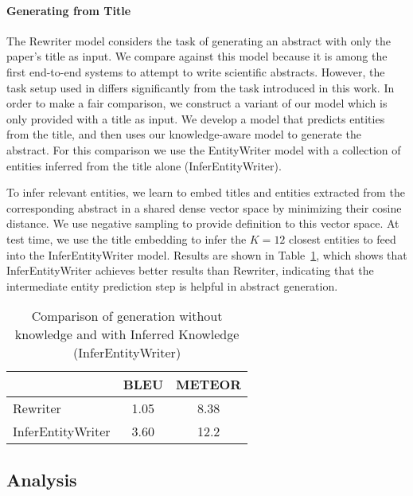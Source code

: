 \documentclass[11pt,a4paper]{article}
\begin{document}
\paragraph{Generating from Title} 
The Rewriter model \cite{wang2018paper} considers the task of generating an abstract with only the paper's title as input. 
We compare against this model because it is among the first end-to-end systems to attempt to write scientific abstracts. 
However, the task setup used in \citet{wang2018paper} differs significantly from the task introduced in this work.
In order to make a fair comparison, we construct a variant of our model which is only provided with a title as input. We develop a model that predicts entities from the title, and then uses our knowledge-aware model to generate the abstract. 
For this comparison we use the EntityWriter model with a collection of entities inferred from the title alone (InferEntityWriter).

 
To infer relevant entities, we learn to embed titles and entities extracted from the corresponding abstract in a shared dense vector space by minimizing their cosine distance.
We use negative sampling to provide definition to this vector space. 
At test time, we use the title embedding to infer the $K=12$ closest entities to feed into the InferEntityWriter model. 
Results are shown in Table~\ref{rewritvsseq}, which shows that InferEntityWriter achieves  better results than Rewriter, indicating that the intermediate entity prediction step is helpful in abstract generation. 

\begin{table} \begin{small}
\begin{center}
\begin{tabular}{lcc}
     & BLEU & METEOR \\ \hline
    Rewriter & 1.05 & 8.38 \\
    InferEntityWriter & 3.60 & 12.2  \\ \hline
\end{tabular}
\caption{Comparison of generation without knowledge and with Inferred Knowledge (InferEntityWriter)}
\label{rewritvsseq}
\end{center}\end{small}
\end{table}

\subsection{Analysis}
\end{document}
